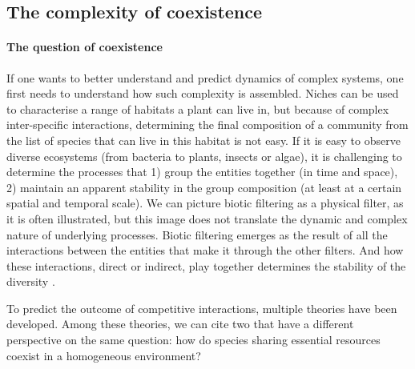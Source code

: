 %
%
%
%
%
%
%

\subsection{The complexity of coexistence}\label{subsection:coexistence}

\paragraph{The question of coexistence}
If one wants to better understand and predict dynamics of complex systems, one first needs to understand how such complexity is assembled. Niches can be used to characterise a range of habitats a plant can live in, but because of complex inter-specific interactions, determining the final composition of a community from the list of species that can live in this habitat is not easy. If it is easy to observe diverse ecosystems (from bacteria to plants, insects or algae), it is challenging to determine the processes that 1) group the entities together (in time and space), 2) maintain an apparent stability in the group composition (at least at a certain spatial and temporal scale). 
We can picture biotic filtering as a physical filter, as it is often illustrated, but this image does not translate the dynamic and complex nature of underlying processes. Biotic filtering emerges as the result of all the interactions between the entities that make it through the other filters. And how these interactions, direct or indirect, play together determines the stability of the diversity \parencite{chesson_mechanisms_2000, levine_importance_2009}.

To predict the outcome of competitive interactions, multiple theories have been developed. Among these theories, we can cite two that have a different perspective on the same question: how do species sharing essential resources coexist in a homogeneous environment?

